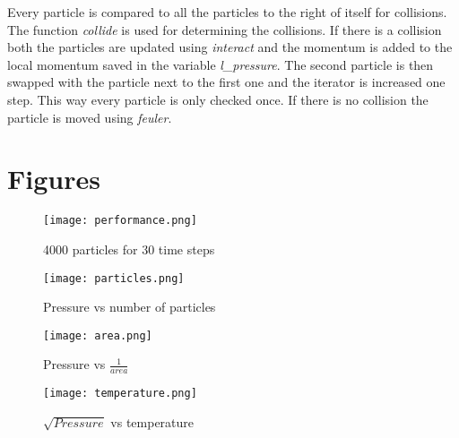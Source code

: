 \documentclass[a4paper, 12pt]{article}
\begin{document}
Every particle is compared to all the particles to the right of itself for
collisions. The function \textit{collide} is used for determining the
collisions. If there is a collision both the particles are updated using
\textit{interact} and the momentum is added to the local momentum saved in the
variable \textit{l\_pressure}. The second particle is then swapped with the
particle next to the first one and the iterator is increased one step. This way
every particle is only checked once. If there is no collision the particle is
moved using \textit{feuler}.

\newpage
\appendix
\section{Figures}
\label{sec:fig}
\begin{figure}[h]
        \centering
        \texttt{[image: performance.png]}
        \caption{4000 particles for 30 time steps}
        \label{fig:perf}
\end{figure}
\begin{figure}[hb]
        \centering
        \texttt{[image: particles.png]}
        \caption{Pressure vs number of particles}
        \label{fig:n}
\end{figure}
\begin{figure}[hb]
        \centering
        \texttt{[image: area.png]}
        \caption{Pressure vs $\frac{1}{area}$}
        \label{fig:V}
\end{figure}
\begin{figure}[hb]
        \centering
        \texttt{[image: temperature.png]}
        \caption{$\sqrt{Pressure}$ vs temperature}
        \label{fig:T}
\end{figure}
\end{document}
